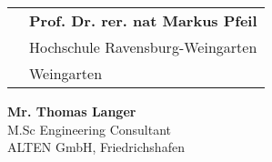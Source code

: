 \documentclass{scrartcl}
\begin{document}
\begin{center}
	  	\begin{spacing}{0.75}
	\begin{longtable}{p{} p{}}
	\hspace*{1cm}{\large\normalfont\bfseries Prof. Dr.-Ing Benedikt Reick} &  {\large\normalfont\bfseries Prof. Dr. rer. nat Markus Pfeil
} \\
\hspace*{1cm}{Hochschule Ravensburg-Weingarten} & {Hochschule Ravensburg-Weingarten}  \\ %
\hspace*{1cm}{Weingarten} & {Weingarten} 
	\end{longtable}	
	\end{spacing}
{\large\normalfont\bfseries Mr. Thomas Langer}\\
{\hspace*{4mm}M.Sc Engineering Consultant}\\
{\hspace*{2mm}ALTEN GmbH, Friedrichshafen}	
	
\end{center}

	
	
	
\end{document}
